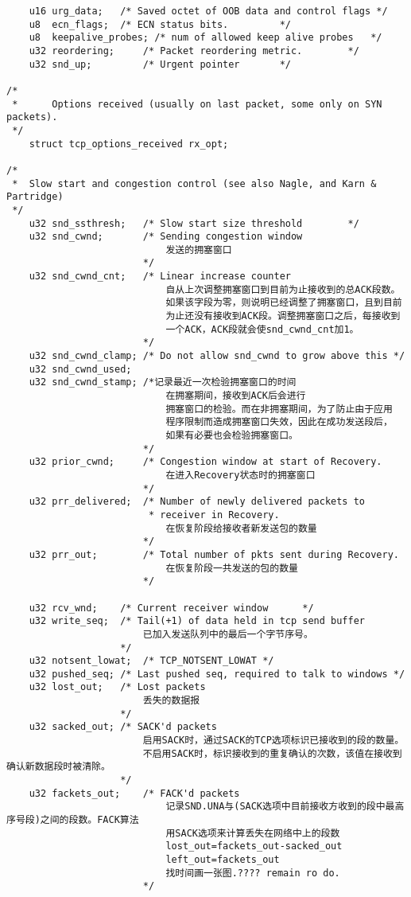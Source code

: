 \begin{verbatim}
    u16 urg_data;   /* Saved octet of OOB data and control flags */
    u8  ecn_flags;  /* ECN status bits.         */
    u8  keepalive_probes; /* num of allowed keep alive probes   */
    u32 reordering;     /* Packet reordering metric.        */
    u32 snd_up;         /* Urgent pointer       */

/*
 *      Options received (usually on last packet, some only on SYN packets).
 */
    struct tcp_options_received rx_opt;

/*
 *  Slow start and congestion control (see also Nagle, and Karn & Partridge)
 */
    u32 snd_ssthresh;   /* Slow start size threshold        */
    u32 snd_cwnd;       /* Sending congestion window        
                            发送的拥塞窗口
                        */
    u32 snd_cwnd_cnt;   /* Linear increase counter      
                            自从上次调整拥塞窗口到目前为止接收到的总ACK段数。
                            如果该字段为零，则说明已经调整了拥塞窗口，且到目前
                            为止还没有接收到ACK段。调整拥塞窗口之后，每接收到
                            一个ACK，ACK段就会使snd_cwnd_cnt加1。
                        */
    u32 snd_cwnd_clamp; /* Do not allow snd_cwnd to grow above this */
    u32 snd_cwnd_used;
    u32 snd_cwnd_stamp; /*记录最近一次检验拥塞窗口的时间
                            在拥塞期间，接收到ACK后会进行
                            拥塞窗口的检验。而在非拥塞期间，为了防止由于应用
                            程序限制而造成拥塞窗口失效，因此在成功发送段后，
                            如果有必要也会检验拥塞窗口。
                        */
    u32 prior_cwnd;     /* Congestion window at start of Recovery. 
                            在进入Recovery状态时的拥塞窗口
                        */
    u32 prr_delivered;  /* Number of newly delivered packets to
                         * receiver in Recovery. 
                            在恢复阶段给接收者新发送包的数量
                        */
    u32 prr_out;        /* Total number of pkts sent during Recovery. 
                            在恢复阶段一共发送的包的数量
                        */

    u32 rcv_wnd;    /* Current receiver window      */
    u32 write_seq;  /* Tail(+1) of data held in tcp send buffer 
                        已加入发送队列中的最后一个字节序号。
                    */
    u32 notsent_lowat;  /* TCP_NOTSENT_LOWAT */
    u32 pushed_seq; /* Last pushed seq, required to talk to windows */
    u32 lost_out;   /* Lost packets         
                        丢失的数据报
                    */
    u32 sacked_out; /* SACK'd packets           
                        启用SACK时，通过SACK的TCP选项标识已接收到的段的数量。
                        不启用SACK时，标识接收到的重复确认的次数，该值在接收到确认新数据段时被清除。
                    */
    u32 fackets_out;    /* FACK'd packets           
                            记录SND.UNA与(SACK选项中目前接收方收到的段中最高序号段)之间的段数。FACK算法
                            用SACK选项来计算丢失在网络中上的段数
                            lost_out=fackets_out-sacked_out
                            left_out=fackets_out
                            找时间画一张图.???? remain ro do.
                        */


\end{verbatim}
